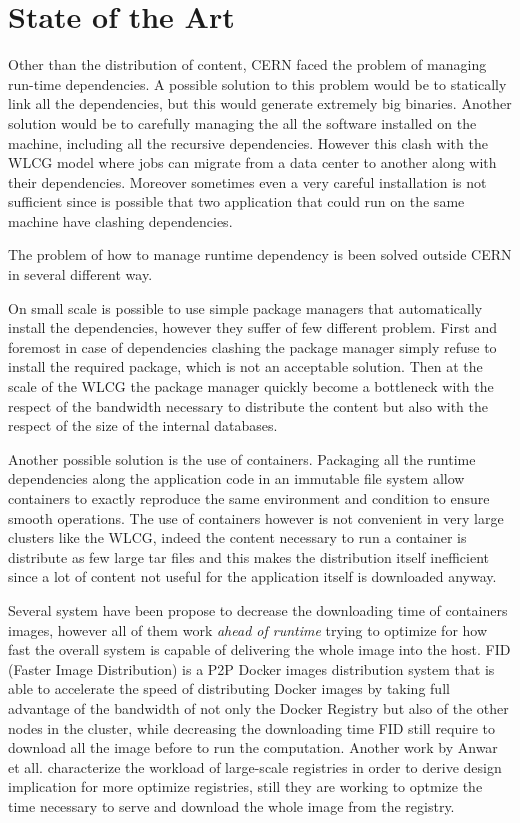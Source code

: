 \chapter{State of the Art}\label{ch:SoA}

Other than the distribution of content, CERN faced the problem of managing
run-time dependencies. A possible solution to this problem would be to
statically link all the dependencies, but this would generate extremely big
binaries.  Another solution would be to carefully managing the all the software
installed on the machine, including all the recursive dependencies. However this
clash with the WLCG model where jobs can migrate from a data center to another
along with their dependencies.  Moreover sometimes even a very careful
installation is not sufficient since is possible that two application that
could run on the same machine have clashing dependencies.

The problem of how to manage runtime dependency is been solved outside CERN in
several different way.

On small scale is possible to use simple package managers that automatically
install the dependencies, however they suffer of few different problem. First
and foremost in case of dependencies clashing the package manager simply refuse
to install the required package, which is not an acceptable solution. Then at
the scale of the WLCG the package manager quickly become a bottleneck with the
respect of the bandwidth necessary to distribute the content but also with the
respect of the size of the internal databases.

Another possible solution is the use of containers. Packaging all the runtime
dependencies along the application code in an immutable file system allow
containers to exactly reproduce the same environment and condition to ensure
smooth operations. The use of containers however is not convenient in very
large clusters like the WLCG, indeed the content necessary to run a container
is distribute as few large tar files and this makes the distribution itself
inefficient since a lot of content not useful for the application itself is
downloaded anyway. 

Several system have been propose to decrease the downloading time of containers
images, however all of them work \textit{ahead of runtime} trying to optimize
for how fast the overall system is capable of delivering the whole image into
the host. FID (Faster Image Distribution) \cite{FID} is a P2P Docker images
distribution system that is able to accelerate the speed of distributing Docker
images by taking full advantage of the bandwidth of not only the Docker
Registry but also of the other nodes in the cluster, while decreasing the
downloading time FID still require to download all the image before to run the
computation. Another work by Anwar et all. \cite{210500} characterize the
workload of large-scale registries in order to derive design implication for
more optimize registries, still they are working to optmize the time necessary
to serve and download the whole image from the registry.

